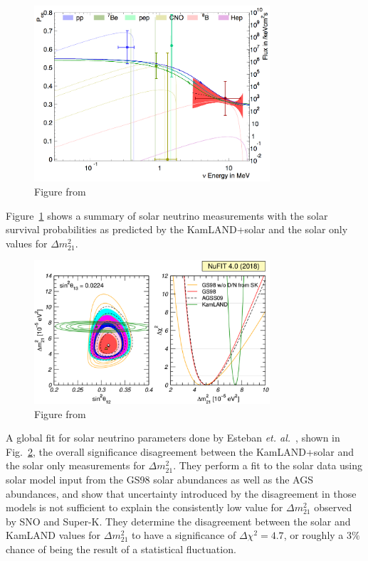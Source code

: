 \begin{figure}[htbp]
    \centering
    \includegraphics[width=0.78\textwidth]{sk_pee_global}
    \caption[]{Figure from~\citep{superk4}}
    \label{fig:sk_pee_global}
\end{figure}

Figure~\ref{fig:sk_pee_global} shows a summary of solar neutrino measurements
with the solar survival probabilities as predicted by the KamLAND+solar and
the solar only values for $\Delta m^{2}_{21}$.

\begin{figure}[htbp]
    \centering
    \includegraphics[width=0.78\textwidth]{nufit_dm21_tension}
    \caption[]{Figure from~\citep{nu_fit4}}
    \label{fig:nufit_dm21_tension}
\end{figure}
A global fit for solar neutrino parameters done by Esteban \textit{et. al.}~\citep{nu_fit4},
shown in Fig.~\ref{fig:nufit_dm21_tension},
the overall significance disagreement between the KamLAND+solar and the solar only
measurements for $\Delta m^{2}_{21}$.
They perform a fit to the solar data using solar model input from the GS98 solar abundances
as well as the AGS abundances, and show that uncertainty introduced by the
disagreement in those models is not sufficient to explain the consistently
low value for $\Delta m^{2}_{21}$ observed by SNO and Super-K.
They determine the disagreement between the solar and KamLAND values for
$\Delta m^{2}_{21}$ to have a significance of $\Delta \chi^{2} = 4.7$, or
roughly a $3\%$ chance of being the result of a statistical fluctuation.


